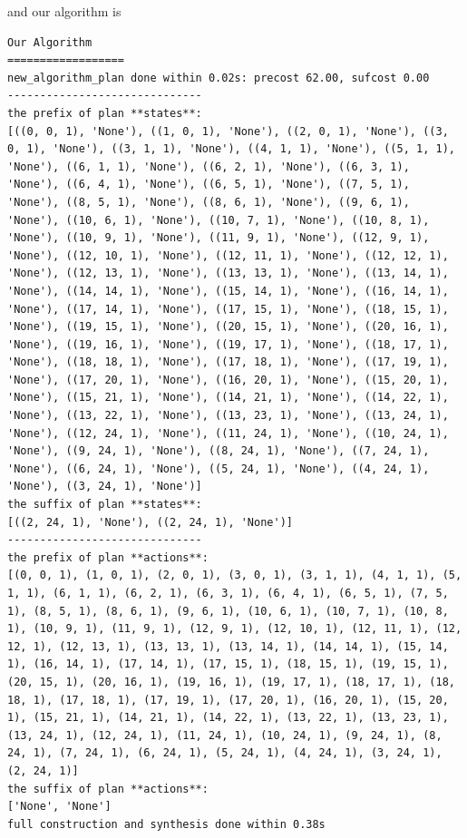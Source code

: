 and our algorithm is 
\begin{lstlisting}
Our Algorithm
==================
new_algorithm_plan done within 0.02s: precost 62.00, sufcost 0.00
------------------------------
the prefix of plan **states**:
[((0, 0, 1), 'None'), ((1, 0, 1), 'None'), ((2, 0, 1), 'None'), ((3, 0, 1), 'None'), ((3, 1, 1), 'None'), ((4, 1, 1), 'None'), ((5, 1, 1), 'None'), ((6, 1, 1), 'None'), ((6, 2, 1), 'None'), ((6, 3, 1), 'None'), ((6, 4, 1), 'None'), ((6, 5, 1), 'None'), ((7, 5, 1), 'None'), ((8, 5, 1), 'None'), ((8, 6, 1), 'None'), ((9, 6, 1), 'None'), ((10, 6, 1), 'None'), ((10, 7, 1), 'None'), ((10, 8, 1), 'None'), ((10, 9, 1), 'None'), ((11, 9, 1), 'None'), ((12, 9, 1), 'None'), ((12, 10, 1), 'None'), ((12, 11, 1), 'None'), ((12, 12, 1), 'None'), ((12, 13, 1), 'None'), ((13, 13, 1), 'None'), ((13, 14, 1), 'None'), ((14, 14, 1), 'None'), ((15, 14, 1), 'None'), ((16, 14, 1), 'None'), ((17, 14, 1), 'None'), ((17, 15, 1), 'None'), ((18, 15, 1), 'None'), ((19, 15, 1), 'None'), ((20, 15, 1), 'None'), ((20, 16, 1), 'None'), ((19, 16, 1), 'None'), ((19, 17, 1), 'None'), ((18, 17, 1), 'None'), ((18, 18, 1), 'None'), ((17, 18, 1), 'None'), ((17, 19, 1), 'None'), ((17, 20, 1), 'None'), ((16, 20, 1), 'None'), ((15, 20, 1), 'None'), ((15, 21, 1), 'None'), ((14, 21, 1), 'None'), ((14, 22, 1), 'None'), ((13, 22, 1), 'None'), ((13, 23, 1), 'None'), ((13, 24, 1), 'None'), ((12, 24, 1), 'None'), ((11, 24, 1), 'None'), ((10, 24, 1), 'None'), ((9, 24, 1), 'None'), ((8, 24, 1), 'None'), ((7, 24, 1), 'None'), ((6, 24, 1), 'None'), ((5, 24, 1), 'None'), ((4, 24, 1), 'None'), ((3, 24, 1), 'None')]
the suffix of plan **states**:
[((2, 24, 1), 'None'), ((2, 24, 1), 'None')]
------------------------------
the prefix of plan **actions**:
[(0, 0, 1), (1, 0, 1), (2, 0, 1), (3, 0, 1), (3, 1, 1), (4, 1, 1), (5, 1, 1), (6, 1, 1), (6, 2, 1), (6, 3, 1), (6, 4, 1), (6, 5, 1), (7, 5, 1), (8, 5, 1), (8, 6, 1), (9, 6, 1), (10, 6, 1), (10, 7, 1), (10, 8, 1), (10, 9, 1), (11, 9, 1), (12, 9, 1), (12, 10, 1), (12, 11, 1), (12, 12, 1), (12, 13, 1), (13, 13, 1), (13, 14, 1), (14, 14, 1), (15, 14, 1), (16, 14, 1), (17, 14, 1), (17, 15, 1), (18, 15, 1), (19, 15, 1), (20, 15, 1), (20, 16, 1), (19, 16, 1), (19, 17, 1), (18, 17, 1), (18, 18, 1), (17, 18, 1), (17, 19, 1), (17, 20, 1), (16, 20, 1), (15, 20, 1), (15, 21, 1), (14, 21, 1), (14, 22, 1), (13, 22, 1), (13, 23, 1), (13, 24, 1), (12, 24, 1), (11, 24, 1), (10, 24, 1), (9, 24, 1), (8, 24, 1), (7, 24, 1), (6, 24, 1), (5, 24, 1), (4, 24, 1), (3, 24, 1), (2, 24, 1)]
the suffix of plan **actions**:
['None', 'None']
full construction and synthesis done within 0.38s 
\end{lstlisting}

